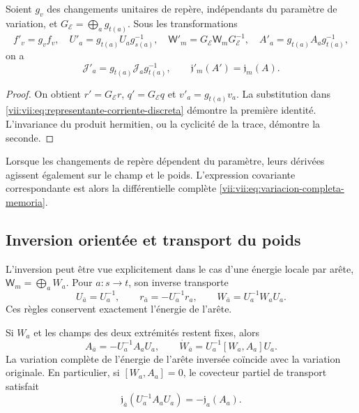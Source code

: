 \begin{proposition}
\label{vii:vii:prop:covariancia-corriente-memoria}
Soient \(g_v\) des changements unitaires de repère, indépendants du paramètre
de variation, et \(G_{\mathcal E}=\bigoplus_a g_{t(a)}\).
Sous les transformations
\[
 f'_v=g_vf_v,\quad U'_a=g_{t(a)}U_ag_{s(a)}^{-1},\quad
 \mathsf W'_m=G_{\mathcal E}\mathsf W_mG_{\mathcal E}^{-1},\quad
 A'_a=g_{t(a)}A_ag_{t(a)}^{-1},
\]
on a
\begin{equation}
 \mathcal J'_a=g_{t(a)}\mathcal J_ag_{t(a)}^{-1},
 \qquad \mathfrak j'_m(A')=\mathfrak j_m(A).
 \label{vii:vii:eq:covariancia-respuesta}
\end{equation}
\end{proposition}

\begin{proof}
On obtient \(r'=G_{\mathcal E}r\), \(q'=G_{\mathcal E}q\) et \(v'_a=g_{t(a)}v_a\). La substitution dans \eqref{vii:vii:eq:representante-corriente-discreta} démontre la première identité. L'invariance du produit hermitien, ou la cyclicité de la trace, démontre la seconde.
\end{proof}

Lorsque les changements de repère dépendent du paramètre, leurs dérivées
agissent également sur le champ et le poids. L'expression covariante
correspondante est alors la différentielle complète
\eqref{vii:vii:eq:variacion-completa-memoria}.

\subsection{Inversion orientée et transport du poids}
\label{vii:vii:subsec:inversion-respuesta}

L'inversion peut être vue explicitement dans le cas d'une énergie locale par arête, \(\mathsf W_m=\bigoplus_a W_a\). Pour \(a:s\to t\), son inverse transporte
\[
 U_{\bar a}=U_a^{-1},\qquad
 r_{\bar a}=-U_a^{-1}r_a,\qquad
 W_{\bar a}=U_a^{-1}W_aU_a.
\]
Ces règles conservent exactement l'énergie de l'arête.

\begin{proposition}
\label{vii:vii:prop:inversion-respuesta}
Si \(W_a\) et les champs des deux extrémités restent fixes, alors
\[
 A_{\bar a}=-U_a^{-1}A_aU_a,\qquad
 \dot W_{\bar a}=U_a^{-1}[W_a,A_a]U_a.
\]
La variation complète de l'énergie de l'arête inversée coïncide avec
la variation originale. En particulier, si \([W_a,A_a]=0\), le covecteur partiel
de transport satisfait
\begin{equation}
 \mathfrak j_{\bar a}(U_a^{-1}A_aU_a)
 =-\mathfrak j_a(A_a).
 \label{vii:vii:eq:imparidad-transporte}
\end{equation}
\end{proposition}

